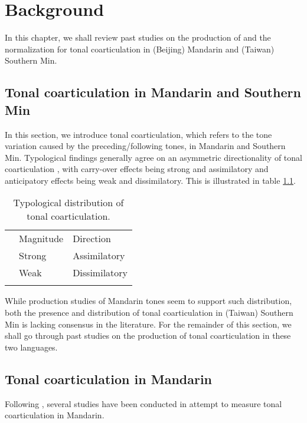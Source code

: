 
\chapter{Background}\label{chapter:Background}

In this chapter, we shall review past studies on the production of and the normalization for tonal coarticulation in (Beijing) Mandarin and (Taiwan) Southern Min. 
\section{Tonal coarticulation in Mandarin and Southern Min}\label{section:Tonal coarticulation in Mandarin and Southern Min}
In this section, we introduce tonal coarticulation, which refers to the tone variation caused by the preceding/following tones, in Mandarin and Southern Min. Typological findings generally agree on an asymmetric directionality of tonal coarticulation \citep{ChangHsieh2012}, with carry-over effects being strong and assimilatory and anticipatory effects being weak and dissimilatory. This is illustrated in table \ref{table:Typologicaldistribution}.

\begin{flushleft}
\begin{table}[hbt!]
\begin{tabularx}{\textwidth}{l|X|X|}
\hhline{~--}
 & Magnitude & Direction \\
\hhline{~|--}\noalign{\vspace*{\doublerulesep}}
\hhline{-||--}
\multicolumn{1}{|l||}{Carry-over} & Strong & Assimilatory\\
\hhline{-||--}
\multicolumn{1}{|l||}{Anticipatory} & Weak & Dissimilatory\\
\hhline{-||--}
\end{tabularx}
\caption{Typological distribution of tonal coarticulation.}
\label{table:Typologicaldistribution}
\end{table}
\end{flushleft}

While production studies of Mandarin tones seem to support such distribution, both the presence and distribution of tonal coarticulation in (Taiwan) Southern Min is lacking consensus in the literature. For the remainder of this section, we shall go through past studies on the production of tonal coarticulation in these two languages.

\section{Tonal coarticulation in Mandarin}\label{section:Tonal coarticulation in Mandarin}
Following \cite{Chao1968}, several studies have been conducted in attempt to measure tonal coarticulation in Mandarin.

